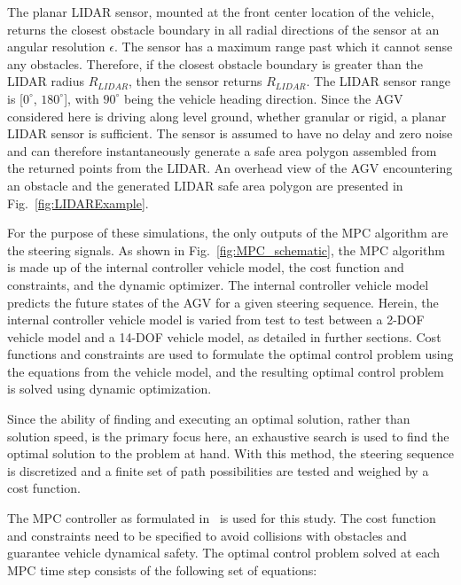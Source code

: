 \documentclass[12pt,onecolumn]{article}
\begin{document}
The planar LIDAR sensor, mounted at the front center location of the vehicle, returns the closest obstacle boundary in all radial directions of the sensor at an angular resolution $\epsilon$. The sensor has a maximum range past which it cannot sense any obstacles. Therefore, if the closest obstacle boundary is greater than the LIDAR radius $R_{LIDAR}$, then the sensor returns $R_{LIDAR}$. The LIDAR sensor range is [$0^\circ$, $180^\circ$], with $90^\circ$ being the vehicle heading direction. Since the AGV considered here is driving along level ground, whether granular or rigid, a planar LIDAR sensor is sufficient. The sensor is assumed to have no delay and zero noise and can therefore instantaneously generate a safe area polygon assembled from the returned points from the LIDAR. An overhead view of the AGV encountering an obstacle and the generated LIDAR safe area polygon are presented in Fig.~\ref{fig:LIDARExample}. 
%

For the purpose of these simulations, the only outputs of the MPC algorithm are the steering signals. As shown in Fig.~\ref{fig:MPC_schematic}, the MPC algorithm is made up of the internal controller vehicle model, the cost function and constraints, and the dynamic optimizer. The internal controller vehicle model predicts the future states of the AGV for a given steering sequence. Herein, the internal controller vehicle model is varied from test to test between a 2-DOF vehicle model and a 14-DOF vehicle model, as detailed in further sections. Cost functions and constraints are used to formulate the optimal control problem using the equations from the vehicle model, and the resulting optimal control problem is solved using dynamic optimization.

Since the ability of finding and executing an optimal solution, rather than solution speed, is the primary focus here, an exhaustive search is used to find the optimal solution to the problem at hand. With this method, the steering sequence is discretized and a finite set of path possibilities are tested and weighed by a cost function. 

The MPC controller as formulated in~\cite{ModelFidelity2016} is used for this study. The cost function and constraints need to be specified to avoid collisions with obstacles and guarantee vehicle dynamical safety. The optimal control problem solved at each MPC time step consists of the following set of equations:
\end{document}
